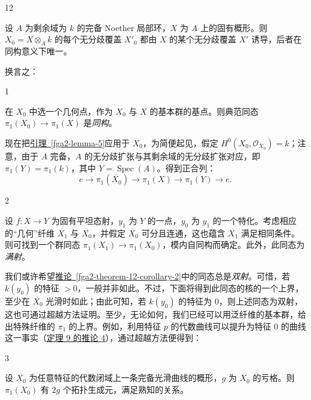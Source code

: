 \begin{theorem}{12}\label{fga2-theorem-12}\skipsinglepar
\par{}设 \(A\) 为剩余域为 \(k\) 的完备 Noether 局部环，\(X\) 为 \(A\) 上的固有概形。则 \(X_0=X\otimes _Ak\) 的每个无分歧覆盖 \(X'_0\) 都由 \(X\) 的某个无分歧覆盖 \(X'\) 诱导，后者在同构意义下唯一。\end{theorem}
\par{}换言之：
\begin{corollary}{1}\label{fga2-theorem-12-corollary-1}\skipsinglepar
\par{}在 \(X_0\) 中选一个几何点，作为 \(X_0\) 与 \(X\) 的基本群的基点。则典范同态 \(\pi _1(X_0)\to \pi _1(X)\) 是\emph{同构}。\end{corollary}
\par{}现在把\hyperref[fga2-lemma-5]{引理~\ref*{fga2-lemma-5}}应用于 \(X_0\)，为简便起见，假定 \(H^0(X_0,\mathcal {O}_{X_0})=k\)；注意，由于 \(A\) 完备，\(A\) 的无分歧扩张与其剩余域的无分歧扩张对应，即 \(\pi _1(Y)=\pi _1(k)\)，其中 \(Y=\operatorname {Spec}(A)\)。得到正合列：\[     e \to  \pi _1(\overline {X_0}) \to  \pi _1(X) \to  \pi _1(Y) \to  e.   \]
\begin{corollary}{2}\label{fga2-theorem-12-corollary-2}\skipsinglepar
\par{}设 \(f\colon  X\to  Y\) 为固有平坦态射，\(y_1\) 为 \(Y\) 的一点，\(y_0\) 为 \(y_1\) 的一个特化。考虑相应的“几何”纤维 \(\overline {X_1}\) 与 \(\overline {X_0}\)，并假定 \(\overline {X_0}\) 可分且连通，这也蕴含 \(\overline {X_1}\) 满足相同条件。则可找到一个群同态 \(\pi _1(X_1)\to \pi _1(X_0)\)，模内自同构而确定。此外，此同态为\emph{满射}。\end{corollary}
\par{}我们或许希望\hyperref[fga2-theorem-12-corollary-2]{推论~\ref*{fga2-theorem-12-corollary-2}}中的同态总是\emph{双射}。可惜，若 \(k(y_0)\) 的特征 \(>0\)，一般并非如此。不过，下面将得到此同态的核的一个上界，至少在 \(\overline {X_0}\) 光滑时如此；由此可知，若 \(k(y_0)\) 的特征为 \(0\)，则上述同态为双射，这也可通过超越方法证明。至少，无论如何，我们已经可以用泛纤维的基本群，给出特殊纤维的 \(\pi _1\) 的上界。例如，利用特征 \(p\) 的代数曲线可以提升为特征 \(0\) 的曲线这一事实（\hyperref[fga2-theorem-9-corollary-4]{定理 9 的推论 4}），通过超越方法便得到：
\begin{corollary}{3}\label{fga2-theorem-12-corollary-3}\skipsinglepar
\par{}设 \(X_0\) 为任意特征的代数闭域上一条完备光滑曲线的概形，\(g\) 为 \(X_0\) 的亏格。则 \(\pi _1(X_0)\) 有 \(2g\) 个拓扑生成元，满足熟知的关系。\end{corollary}
